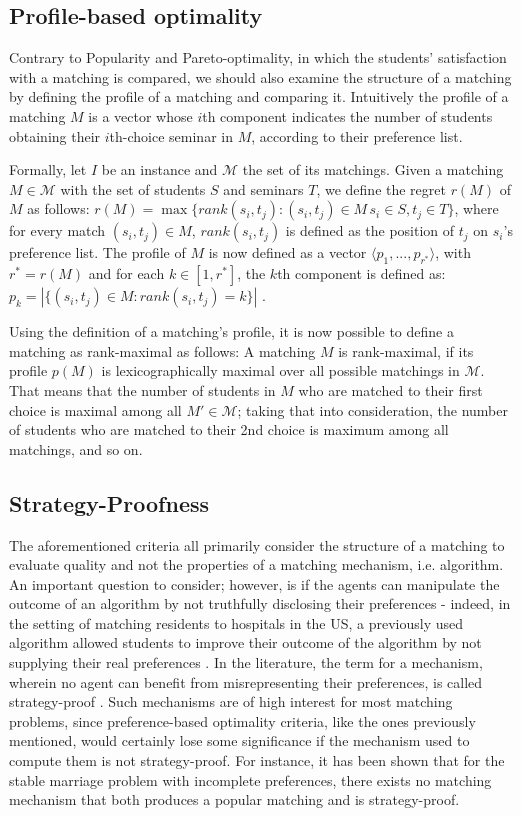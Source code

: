 \subsection{Profile-based optimality}\label{sec:profile}
Contrary to Popularity and Pareto-optimality, in which the students' satisfaction with a matching is compared, we should also examine the structure of a matching by defining the profile of a matching and comparing it. Intuitively the profile of a matching $M$ is a vector whose $i$th component indicates the number of students obtaining their $i$th-choice seminar in $M$, according to their preference list. 

Formally, let $I$ be an instance and $\mathcal{M}$ the set of its matchings. Given a matching $M \in \mathcal{M}$ with the set of students $S$ and seminars $T$, we define the regret $r(M)$ of $M$ as follows:
$r(M) = \max \{rank(s_i, t_j): (s_i, t_j)\in M\, s_i \in S, t_j \in T\}$, where for every match $(s_i, t_j) \in M$, $rank(s_i, t_j)$ is defined as the position of $t_j$ on $s_i$'s preference list. The profile of $M$ is now defined as a vector $\langle p_1,..., p_{r^*} \rangle$, with $r^* = r(M)$ and for each $k \in [1,r^*]$, the $k$th component is defined as: $p_k=|\{(s_i, t_j) \in M: rank(s_i, t_j) = k\}|$ \cite{algorithmics}.

Using the definition of a matching's profile, it is now possible to define a matching as rank-maximal as follows: A matching $M$ is rank-maximal, if its profile $p(M)$ is lexicographically maximal over all possible matchings in $\mathcal{M}$. That means that the number of students in $M$ who are matched to their first choice is maximal among all $M' \in \mathcal{M}$; taking that into consideration, the number of students who are matched to their 2nd choice is maximum among all matchings, and so on.

\subsection{Strategy-Proofness}
The aforementioned criteria all primarily consider the structure of a matching to evaluate quality and not the properties of a matching mechanism, i.e. algorithm. An important question to consider; however, is if the agents can manipulate the outcome of an algorithm by not truthfully disclosing their preferences - indeed, in the setting of matching residents to hospitals in the US, a previously used algorithm allowed students to improve their outcome of the algorithm by not supplying their real preferences \cite{Gusfield}. In the literature, the term for a mechanism, wherein no agent can benefit from misrepresenting their preferences, is called strategy-proof \cite{Klaus}. Such mechanisms are of high interest for most matching problems, since preference-based optimality criteria, like the ones previously mentioned, would certainly lose some significance if the mechanism used to compute them is not strategy-proof.
For instance, it has been shown \cite{ROTH1982127} that for the stable marriage problem with incomplete preferences, there exists no matching mechanism that both produces a popular matching and is strategy-proof.

